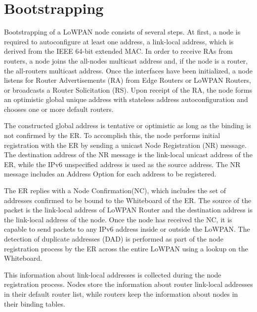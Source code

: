 \section{Bootstrapping}
Bootstrapping of a LoWPAN node consists of several steps.  At first, a node is required to autoconfigure at least one address, a link-local address, which is derived from the IEEE 64-bit extended MAC. In order to receive RAs from routers, a node joins the all-nodes multicast address and, if the node is a router, the all-routers multicast address. Once the interfaces have been initialized, a node listens for Router Advertisements (RA) from Edge Routers or LoWPAN Routers, or broadcasts a Router Solicitation (RS). Upon receipt of the RA, the node forms an optimistic global unique address with stateless address autoconfiguration and chooses one or more default routers. 

The constructed global address is tentative or optimistic as long as the binding is not confirmed by the ER. To accomplish this, the node performs initial registration with the ER by sending a unicast Node Registration (NR) message. The destination address of the NR message is the link-local unicast address of the ER, while the IPv6 unspecified address is used as the source address.  The NR message includes an Address Option for each address to be registered. 

The ER replies with a Node Confirmation(NC), which includes the set of addresses confirmed to be bound to the Whiteboard of the ER.  The
source of the packet is the link-local address of LoWPAN Router and the destination address is the link-local address of the node. Once the node has received the NC, it is capable to send packets to any IPv6 address inside or outside the LoWPAN. The detection of duplicate addresses (DAD) is performed as part of the node registration process by the ER across the entire LoWPAN using a lookup on the Whiteboard. 

This information about link-local addresses is collected during the node registration process. Nodes store the information about router link-local addresses in their default router list, while routers keep the information about nodes in their binding tables. 

